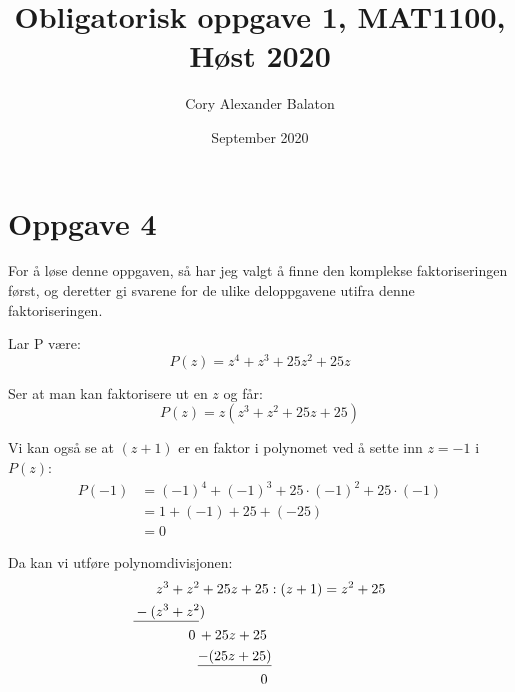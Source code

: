 \documentclass[12pt, a4paper]{article}
\title{Obligatorisk oppgave 1, MAT1100, Høst 2020}
\author{Cory Alexander Balaton}
\date{September 2020}
\begin{document}
\maketitle
\newpage




\section*{Oppgave 4}
For å løse denne oppgaven, så har jeg valgt å finne den komplekse faktoriseringen først, og deretter gi
svarene for de ulike deloppgavene utifra denne faktoriseringen.
\newline\newline

\begin{flushleft}
Lar P være:
\begin{equation}
    P(z) = z^4 + z^3 + 25z^2 + 25z
\end{equation}
\newline

Ser at man kan faktorisere ut en $z$ og får:
\begin{equation}
    P(z) = z(z^3 + z^2 + 25z + 25)
\end{equation}
\newline

Vi kan også se at $(z + 1)$ er en faktor i polynomet ved å sette inn $z = -1$ i $P(z)$:
\begin{equation}
    \begin{split}
        P(-1) &= (-1)^4 + (-1)^3 + 25 \cdot (-1)^2 + 25 \cdot (-1) \\
              &= 1 + (-1) + 25 + (-25) \\
              &= 0
    \end{split}
\end{equation}
\newline

Da kan vi utføre polynomdivisjonen:
\begin{equation}
    \begin{split}
        &z^3 + z^2 + 25z + 25 : (z + 1) = z^2 + 25 \\
        \mathrlap{\underline{\phantom{-(z^3 + z^2)}}}-(&z^3 + z^2) \\
        &~~~~~~~0 \, + 25z + 25 \\
        &~~~~~~~~~ \mathrlap{\underline{-(25z + 25)}} \\
        &~~~~~~~~~~~~~~~~~~~~~~\,0
    \end{split}
\end{equation}
\newline


\end{flushleft}
\end{document}
